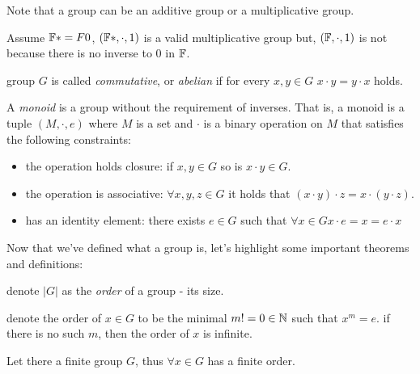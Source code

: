 \begin{remark}
    Note that a group can be an additive group or a multiplicative group.
\end{remark}
\begin{example}
    Assume $\mathbb{F}*=F\\{0}$, $(\mathbb{F}*, \cdot, 1)$ is a valid multiplicative group but,
    $(\mathbb{F}, \cdot, 1)$ is not because there is no inverse to $0$ in $\mathbb{F}$.
\end{example}

\begin{definition}
    group $G$ is called \emph{commutative}, or \emph{abelian} if for every $x,y\in G$ $x\cdot y=y\cdot x$ holds.
\end{definition}


\begin{definition}
    A \emph{monoid} is a group without the requirement of inverses.
    That is, a monoid is a tuple $(M,\cdot,e)$ where $M$ is a set and $\cdot$ is a binary operation on $M$
    that satisfies the following constraints:

    \begin{itemize}
    \item the operation holds closure: if $x,y\in G$ so is $x\cdot y\in G$.
    \item the operation is associative: $\forall x,y,z\in G$ it holds that $(x\cdot y)\cdot z = x\cdot (y\cdot z)$.
    \item has an identity element: there exists $e\in G$ such that $\forall x\in G x\cdot e = x = e\cdot x$
    \end{itemize}
\end{definition}


Now that we've defined what a group is, let's highlight some important theorems and definitions:

\begin{definition}
    denote $|G|$ as the \emph{order} of a group - its size.
\end{definition}

\begin{definition}
    denote the order of $x\in G$ to be the minimal $m!=0\in\mathbb{N}$ such that  $x^m=e$. if there is no such $m$, then
    the order of $x$ is infinite.
\end{definition}

\begin{theorem}
    Let there a finite group $G$, thus $\forall x\in G$ has a finite order.
\end{theorem}

